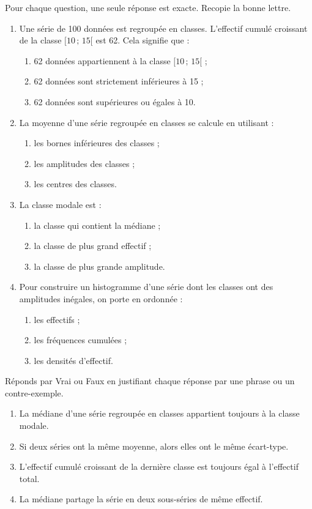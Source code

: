 \documentclass[11pt]{article}
\begin{document}
\begin{exercice}
Pour chaque question, une seule réponse est exacte. Recopie la bonne lettre.
\begin{enumerate}
\item Une série de 100 données est regroupée en classes. L'effectif cumulé croissant de la classe $[10\,;\,15[$ est 62. Cela signifie que :
\begin{enumerate}
\item[a)] 62 données appartiennent à la classe $[10\,;\,15[$ ;
\item[b)] 62 données sont strictement inférieures à 15 ;
\item[c)] 62 données sont supérieures ou égales à 10.
\end{enumerate}
\item La moyenne d'une série regroupée en classes se calcule en utilisant :
\begin{enumerate}
\item[a)] les bornes inférieures des classes ;
\item[b)] les amplitudes des classes ;
\item[c)] les centres des classes.
\end{enumerate}
\item La classe modale est :
\begin{enumerate}
\item[a)] la classe qui contient la médiane ;
\item[b)] la classe de plus grand effectif ;
\item[c)] la classe de plus grande amplitude.
\end{enumerate}
\item Pour construire un histogramme d'une série dont les classes ont des amplitudes inégales, on porte en ordonnée :
\begin{enumerate}
\item[a)] les effectifs ;
\item[b)] les fréquences cumulées ;
\item[c)] les densités d'effectif.
\end{enumerate}
\end{enumerate}
\end{exercice}

\begin{exercice}
Réponds par Vrai ou Faux en justifiant chaque réponse par une phrase ou un contre-exemple.
\begin{enumerate}
\item La médiane d'une série regroupée en classes appartient toujours à la classe modale.
\item Si deux séries ont la même moyenne, alors elles ont le même écart-type.
\item L'effectif cumulé croissant de la dernière classe est toujours égal à l'effectif total.
\item La médiane partage la série en deux sous-séries de même effectif.
\end{enumerate}
\end{exercice}
\end{document}
